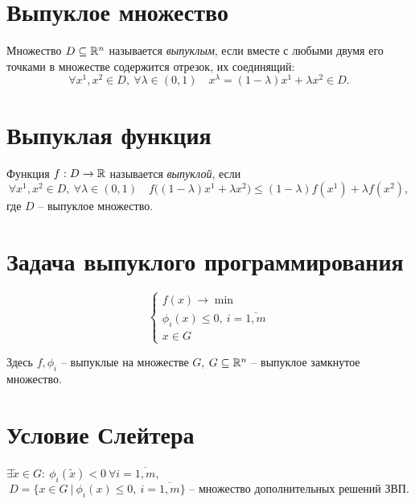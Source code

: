 \section{Выпуклое множество}

\begin{definition}
	Множество $D \subseteq \mathbb{R}^{n}$ называется \emph{выпуклым}, если вместе с любыми двумя его точками в множестве содержится отрезок, их соединящий:
	\[
		\forall x^{1}, x^{2} \in D, \ \forall \lambda \in (0,1) \quad x^{\lambda} = (1 - \lambda)x^{1} + \lambda x^{2} \in D.
	\]
\end{definition}

\section{Выпуклая функция}

\begin{definition}
	Функция $f : D \rightarrow \mathbb{R}$ называется \emph{выпуклой}, если
	\[
		\forall x^{1},x^{2} \in D, \ \forall \lambda \in (0,1) \quad f \big((1-\lambda)x^{1} + \lambda x^{2}\big) \leqslant (1-\lambda)f(x^{1}) + \lambda f(x^{2}),
	\]
	где $D$ -- выпуклое множество.
\end{definition}

\section{Задача выпуклого программирования}

\begin{task}
	\[
		\left\{\begin{array}{l}
			f(x) \rightarrow \min                       \\
			\phi_i(x) \leqslant 0, \ i = \overline{1,m} \\
			x \in G
		\end{array}\right.
	\]

	Здесь $f,\phi_i$ -- выпуклые на множестве $G$, $G \subseteq \mathbb{R}^n$ -- выпуклое замкнутое множество.
\end{task}

\section{Условие Слейтера}

\begin{note}
	$\exists \widetilde{x} \in G: \ \phi_i(\widetilde{x}) < 0 \ \forall i = \overline{1,m}$,
	\[
		D = \big\{x \in G \ | \ \phi_i(x) \leqslant 0, \ i = \overline{1,m}\big\} \text{ -- множество дополнительных решений ЗВП}.
	\]
\end{note}

